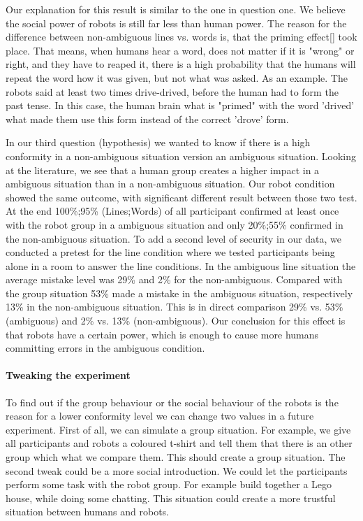 \documentclass{acm_proc_article-sp}
\begin{document}
Our explanation for this result is similar to the one in question one. We believe the social power of robots is still far less than human power. The reason  for the difference between non-ambiguous lines vs. words is, that the priming effect[] took place. That means, when humans hear a word, does not matter if it is "wrong" or right, and they have to reaped it, there is a high probability that the humans will repeat the word how it was given, but not what was asked. As an example. The robots said at least two times drive-drived, before the human had to form the past tense. In this case, the human brain what is "primed" with the word 'drived' what made them use this form instead of the correct 'drove' form.  

In our third question (hypothesis) we wanted to know if there is a high conformity in a non-ambiguous situation version an ambiguous situation. Looking at the literature, we see that a human group creates a higher impact in a ambiguous situation than in a non-ambiguous situation. Our robot condition showed the same outcome, with significant different result between those two test. At the end 100\%;95\% (Lines;Words) of all participant confirmed at least once with the robot group in a ambiguous situation and only 20\%;55\% confirmed in the non-ambiguous situation. To add a second level of security in our data, we conducted a pretest for the line condition where we tested participants being alone in a room to answer the line conditions. In the ambiguous line situation the average mistake level was 29\% and 2\% for the non-ambiguous. Compared with the group situation 53\% made a mistake in the ambiguous situation, respectively 13\% in the non-ambiguous situation. This is in direct comparison 29\% vs. 53\% (ambiguous) and 2\% vs. 13\% (non-ambiguous). Our conclusion for this effect is that robots have a certain power, which is enough to cause more humans committing errors in the ambiguous condition.

\paragraph{Tweaking the experiment}To find out if the group behaviour or the social behaviour of the robots is the reason for a lower conformity level we can change two values in a future experiment. First of all, we can simulate a group situation. For example, we give all participants and robots a coloured t-shirt and tell them that there is an other group which what we compare them. This should create a group situation. The second tweak could be a more social introduction. We could let the participants perform some task with the robot group. For example build together a Lego house, while doing some chatting. This situation could create a more trustful situation between humans and robots. 
\end{document}
